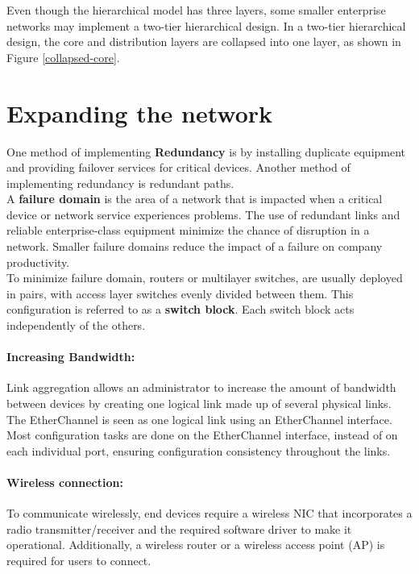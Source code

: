 Even though the hierarchical model has three layers, some smaller enterprise networks may implement a two-tier hierarchical design. In a two-tier hierarchical design, the core and distribution layers are collapsed into one layer, as shown in Figure \ref{collapsed-core}.

\section{Expanding the network}

One method of implementing \textbf{Redundancy} is by installing duplicate equipment and providing failover services for critical devices. Another method of implementing redundancy is redundant paths.\\

A \textbf{failure domain} is the area of a network that is impacted when a critical device or network service experiences problems. The use of redundant links and reliable enterprise-class equipment minimize the chance of disruption in a network. Smaller failure domains reduce the impact of a failure on company productivity.\\

To minimize failure domain, routers or multilayer switches, are usually deployed in pairs, with access layer switches evenly divided between them. This configuration is referred to as a \textbf{switch block}. Each switch block acts independently of the others.

\paragraph{Increasing Bandwidth:} Link aggregation allows an administrator to increase the amount of bandwidth between devices by creating one logical link made up of several physical links. The EtherChannel is seen as one logical link using an EtherChannel interface. Most configuration tasks are done on the EtherChannel interface, instead of on each individual port, ensuring configuration consistency throughout the links.

\paragraph{Wireless connection:} To communicate wirelessly, end devices require a wireless NIC that incorporates a radio transmitter/receiver and the required software driver to make it operational. Additionally, a wireless router or a wireless access point (AP) is required for users to connect.

